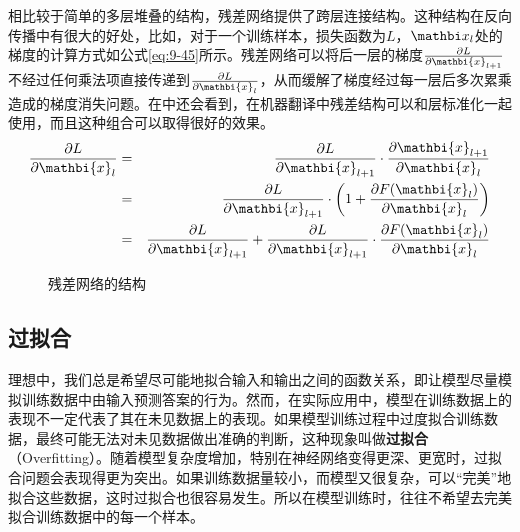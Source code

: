 \begin{itemize}
相比较于简单的多层堆叠的结构，残差网络提供了跨层连接结构。这种结构在反向传播中有很大的好处，比如，对于一个训练样本，损失函数为$L$，$ \mathbi x_l $处的梯度的计算方式如公式\eqref{eq:9-45}所示。残差网络可以将后一层的梯度$ \frac{\partial L}{\partial {\mathbi{x}}_{l+1}} $不经过任何乘法项直接传递到$ \frac{\partial L}{\partial {\mathbi{x}}_l} $，从而缓解了梯度经过每一层后多次累乘造成的梯度消失问题。在{\chaptertwelve}中还会看到，在机器翻译中残差结构可以和层标准化一起使用，而且这种组合可以取得很好的效果。
\begin{eqnarray}
\frac{\partial L}{\partial {\mathbi{x}}_l}&=&\frac{\partial L}{\partial {\mathbi{x}}_{l+1}} \cdot  \frac{\partial {\mathbi{x}}_{l+1}}{\partial {\mathbi{x}}_l}\nonumber\\
&=&\frac{\partial L}{\partial {\mathbi{x}}_{l+1}} \cdot \left(1+\frac{\partial F({\mathbi{x}}_l)}{\partial {\mathbi{x}}_l}\right)\nonumber\\
&=&\frac{\partial L}{\partial {\mathbi{x}}_{l+1}}+\frac{\partial L}{\partial {\mathbi{x}}_{l+1}} \cdot  \frac{\partial F({\mathbi{x}}_l)}{\partial {\mathbi{x}}_l}
\label{eq:9-45}
\end{eqnarray}


\begin{figure}[htp]
\centering

\caption{残差网络的结构}
\label{fig:9-51}
\end{figure}
\end{itemize}


\subsection{过拟合}\label{sec:9.4.5}

\parinterval  理想中，我们总是希望尽可能地拟合输入和输出之间的函数关系，即让模型尽量模拟训练数据中由输入预测答案的行为。然而，在实际应用中，模型在训练数据上的表现不一定代表了其在未见数据上的表现。如果模型训练过程中过度拟合训练数据，最终可能无法对未见数据做出准确的判断，这种现象叫做{\small\sffamily\bfseries{过拟合}}（Overfitting）。随着模型复杂度增加，特别在神经网络变得更深、更宽时，过拟合问题会表现得更为突出。如果训练数据量较小，而模型又很复杂，可以“完美”地拟合这些数据，这时过拟合也很容易发生。所以在模型训练时，往往不希望去完美拟合训练数据中的每一个样本。

